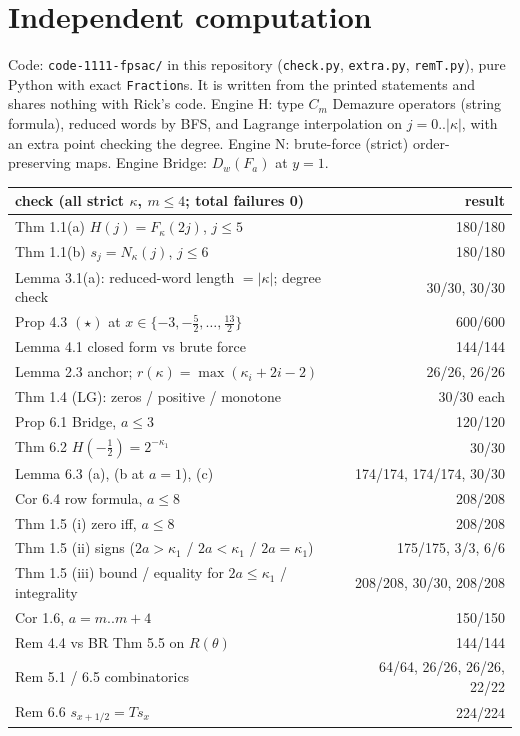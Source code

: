\documentclass[11pt]{article}
\begin{document}
\section{Independent computation}

Code: \texttt{code-1111-fpsac/} in this repository (\texttt{check.py}, \texttt{extra.py},
\texttt{remT.py}), pure Python with exact \texttt{Fraction}s. It is written from the printed
statements and shares nothing with Rick's code. Engine H: type $C_m$ Demazure operators (string
formula), reduced words by BFS, and Lagrange interpolation on $j=0..|\kappa|$, with an extra point
checking the degree. Engine N: brute-force (strict) order-preserving maps. Engine Bridge:
$D_w(F_a)$ at $y=1$.

\begin{center}\small
\begin{tabular}{@{}lr@{}}\toprule
check (all strict $\kappa$, $m\le4$; total failures 0) & result\\\midrule
Thm 1.1(a) $H(j)=F_\kappa(2j)$, $j\le5$ & 180/180\\
Thm 1.1(b) $s_j=N_\kappa(j)$, $j\le6$ & 180/180\\
Lemma 3.1(a): reduced-word length $=|\kappa|$; degree check & 30/30, 30/30\\
Prop 4.3 $(\star)$ at $x\in\{-3,-\frac52,\dots,\frac{13}2\}$ & 600/600\\
Lemma 4.1 closed form vs brute force & 144/144\\
Lemma 2.3 anchor; $r(\kappa)=\max(\kappa_i+2i-2)$ & 26/26, 26/26\\
Thm 1.4 (LG): zeros / positive / monotone & 30/30 each\\
Prop 6.1 Bridge, $a\le3$ & 120/120\\
Thm 6.2 $H(-\frac12)=2^{-\kappa_1}$ & 30/30\\
Lemma 6.3 (a), (b at $a=1$), (c) & 174/174, 174/174, 30/30\\
Cor 6.4 row formula, $a\le8$ & 208/208\\
Thm 1.5 (i) zero iff, $a\le8$ & 208/208\\
Thm 1.5 (ii) signs ($2a>\kappa_1$ / $2a<\kappa_1$ / $2a=\kappa_1$) & 175/175, 3/3, 6/6\\
Thm 1.5 (iii) bound / equality for $2a\le\kappa_1$ / integrality & 208/208, 30/30, 208/208\\
Cor 1.6, $a=m..m+4$ & 150/150\\
Rem 4.4 vs BR Thm 5.5 on $R(\theta)$ & 144/144\\
Rem 5.1 / 6.5 combinatorics & 64/64, 26/26, 26/26, 22/22\\
Rem 6.6 $s_{x+1/2}=Ts_x$ & 224/224\\
\bottomrule\end{tabular}
\end{center}
\end{document}
